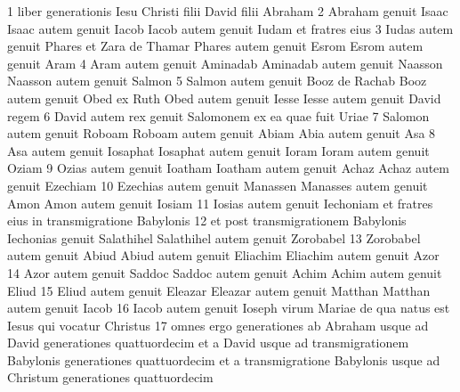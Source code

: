 
1 liber generationis Iesu Christi filii David filii Abraham  2 Abraham genuit Isaac Isaac autem genuit Iacob Iacob autem genuit Iudam et fratres eius  3 Iudas autem genuit Phares et Zara de Thamar Phares autem genuit Esrom Esrom autem genuit Aram  4 Aram autem genuit Aminadab Aminadab autem genuit Naasson Naasson autem genuit Salmon  5 Salmon autem genuit Booz de Rachab Booz autem genuit Obed ex Ruth Obed autem genuit Iesse Iesse autem genuit David regem  6 David autem rex genuit Salomonem ex ea quae fuit Uriae  7 Salomon autem genuit Roboam Roboam autem genuit Abiam Abia autem genuit Asa  8 Asa autem genuit Iosaphat Iosaphat autem genuit Ioram Ioram autem genuit Oziam  9 Ozias autem genuit Ioatham Ioatham autem genuit Achaz Achaz autem genuit Ezechiam  10 Ezechias autem genuit Manassen Manasses autem genuit Amon Amon autem genuit Iosiam  11 Iosias autem genuit Iechoniam et fratres eius in transmigratione Babylonis  12 et post transmigrationem Babylonis Iechonias genuit Salathihel Salathihel autem genuit Zorobabel  13 Zorobabel autem genuit Abiud Abiud autem genuit Eliachim Eliachim autem genuit Azor  14 Azor autem genuit Saddoc Saddoc autem genuit Achim Achim autem genuit Eliud  15 Eliud autem genuit Eleazar Eleazar autem genuit Matthan Matthan autem genuit Iacob  16 Iacob autem genuit Ioseph virum Mariae de qua natus est Iesus qui vocatur Christus  17 omnes ergo generationes ab Abraham usque ad David generationes quattuordecim et a David usque ad transmigrationem Babylonis generationes quattuordecim et a transmigratione Babylonis usque ad Christum generationes quattuordecim

